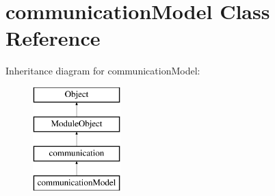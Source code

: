 \hypertarget{classcommunicationModel}{}\section{communication\+Model Class Reference}
\label{classcommunicationModel}
Inheritance diagram for communication\+Model\+:\begin{figure}[H]
\begin{center}
\leavevmode
\includegraphics[height=4.000000cm]{classcommunicationModel}
\end{center}
\end{figure}

